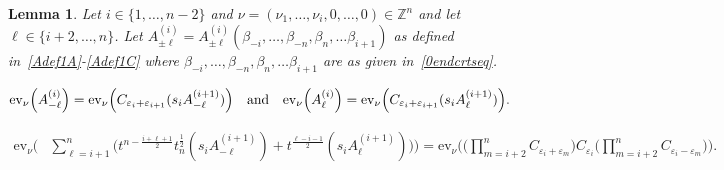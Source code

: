 \documentclass[11pt]{article}
\theoremstyle{plain}
\newtheorem{lemma}[thm]{Lemma}
\theoremstyle{definition}
\theoremstyle{remark}
\numberwithin{equation}{section}
\def\ZZ{\mathbb{Z}}
\def\ev{\mathrm{ev}}
\newcounter{r}
\newcounter{s}
\begin{document}
\begin{lemma} \label{endcombgen}
Let $i\in \{ 1, \ldots, n-2\}$
and $\nu =(\nu_1, \ldots, \nu_i, 0, \ldots, 0)\in \ZZ^n$ and let $\ell\in \{i+2, \ldots, n\}$.  
Let $A^{(i)}_{\pm\ell}= A^{(i)}_{\pm\ell}(\beta_{-i}, \ldots, \beta_{-n}, \beta_n, \ldots \beta_{i+1})$ as defined in~\eqref{Adef1A}-\eqref{Adef1C}
where $\beta_{-i}, \ldots, \beta_{-n}, \beta_n, \ldots \beta_{i+1}$  are as given in~\eqref{0endcrtseq}.
\item[(a)]
$\displaystyle{
\ev_\nu\Big(A^{(i)}_{-\ell}\Big) = \ev_\nu\Big(C_{\varepsilon_i+\varepsilon_{i+1}}(s_iA^{(i+1)}_{-\ell}) \Big)
\quad\hbox{and}\quad
\ev_\nu\Big(A^{(i)}_{\ell} \Big)
= \ev_\nu\Big(C_{\varepsilon_i+\varepsilon_{i+1}}(s_iA^{(i+1)}_{\ell})\Big).
}$
\item[(b)]
\begin{align*}
\ev_\nu\Big(&\sum_{\ell=i+1}^n \big(
t^{n-\frac{i+\ell+1}{2}} t_n^{\frac12} (s_iA^{(i+1)}_{-\ell})
+ 
t^{\frac{\ell-i-1}{2}}(s_iA^{(i+1)}_\ell) \big)
\Big)
=\ev_\nu\Big(\Big(\prod_{m=i+2}^n C_{\varepsilon_i+\varepsilon_m}\Big) C_{\varepsilon_i}
\Big(\prod_{m=i+2}^n C_{\varepsilon_i-\varepsilon_m}\Big)\Big).
\end{align*}
\end{lemma}
\end{document}
